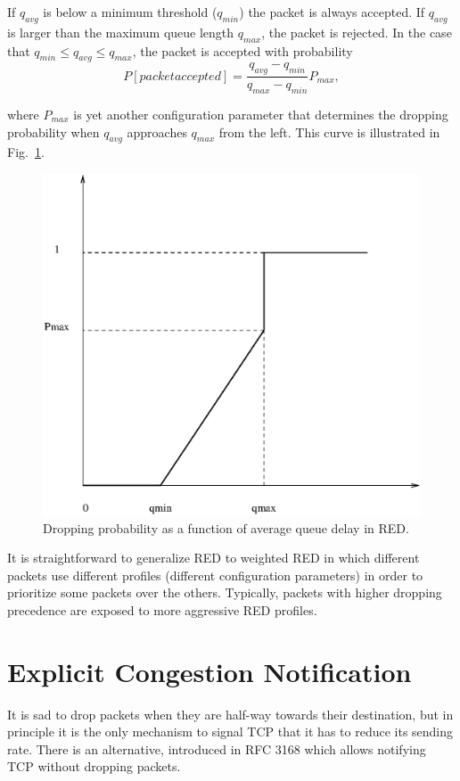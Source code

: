 If $q_{avg}$ is below a minimum threshold ($q_{min}$) the packet is always accepted.
If $q_{avg}$ is larger than the maximum queue length $q_{max}$, the packet is rejected.
In the case that $q_{min} \leq q_{avg} \leq q_{max}$, the packet is accepted with probability
\begin{equation}
P[packet accepted] = \frac{q_{avg}-q_{min}}{q_{max}-q_{min}}P_{max},
\end{equation}

where $P_{max}$ is yet another configuration parameter that determines the dropping probability when $q_{avg}$ approaches $q_{max}$ from the left.
This curve is illustrated in Fig.~\ref{fig:RED}.
\begin{figure}[h]
\centering
\includegraphics[width=0.8\linewidth]{figures/RED.eps}
\caption{Dropping probability as a function of average queue delay in RED.}
\label{fig:RED}
\end{figure}
  
It is straightforward to generalize RED to weighted RED in which different packets use different profiles (different configuration parameters) in order to prioritize some packets over the others.
Typically, packets with higher dropping precedence are exposed to more aggressive RED profiles.

\section{Explicit Congestion Notification}

It is sad to drop packets when they are half-way towards their destination, but in principle it is the only mechanism to signal TCP that it has to reduce its sending rate.
There is an alternative, introduced in  RFC 3168 \cite{rfc3168} which allows notifying TCP without dropping packets.

